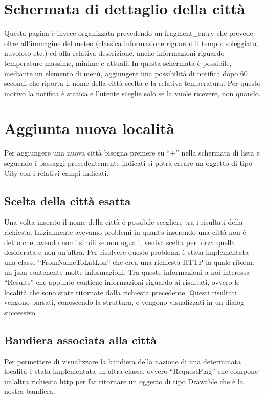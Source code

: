 \documentclass[twoside]{supsistudent}
\begin{document}
\section{Schermata di dettaglio della città}
Questa pagina è invece organizzata prevedendo un fragment\_entry che prevede oltre all’immagine del meteo (classica informazione riguardo il tempo: soleggiato, nuvoloso etc.) ed alla relativa descrizione, anche informazioni riguardo temperature massime, minime e attuali.
In questa schermata è possibile, mediante un elemento di menù, aggiungere una possibilità di notifica dopo 60 secondi che riporta il nome della città scelta e la relativa temperatura. Per questo motivo la notifica è statica e l’utente sceglie solo se la vuole ricevere, non quando.

\section{Aggiunta nuova località}
Per aggiungere una nuova città bisogna premere su “+” nella schermata di lista e seguendo i passaggi precedentemente indicati si potrà creare un oggetto di tipo City con i relativi campi indicati.

\subsection{Scelta della città esatta}
Una volta inserito il nome della città è possibile scegliere tra i risultati della richiesta.
Inizialmente avevamo problemi in quanto inserendo una città non è detto che, avendo nomi simili se non uguali, veniva scelta per forza quella desiderata e non un’altra. Per risolvere questo problema è stata implementata una classe “FromNameToLatLon” che crea una richiesta HTTP la quale ritorna un json contenente molte informazioni. Tra queste informazioni a noi interessa “Results” che appunto contiene informazioni riguardo ai risultati, ovvero le località che sono state ritornate dalla richiesta precedente. Questi risultati vengono parsati, conoscendo la struttura, e vengono visualizzati in un dialog successivo.

\subsection{Bandiera associata alla città}
Per permettere di visualizzare la bandiera della nazione di una determinata località è stata implementata un’altra classe, ovvero “RequestFlag” che compone un’altra richiesta http per far ritornare un oggetto di tipo Drawable che è la nostra bandiera.
\end{document}
